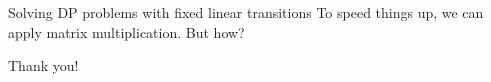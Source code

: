 \documentclass{beamer}
\begin{document}
\begin{frame}[fragile]{Solving DP problems with fixed linear transitions}
  To speed things up, we can apply matrix multiplication. But how?
  \pause \newline
\end{frame}

\begin{frame}{}
                \LARGE{\centerline{Thank you!}}
\end{frame}
\end{document}
